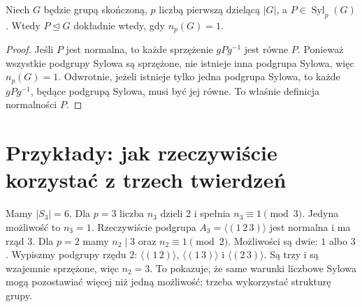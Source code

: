 \begin{wniosek}
\label{aa:wn:normalna-sylow}
Niech $G$ będzie grupą skończoną, $p$ liczbą pierwszą
dzielącą $|G|$, a $P\in\operatorname{Syl}_p(G)$.
Wtedy $P\trianglelefteq G$ dokładnie wtedy, gdy $n_p(G)=1$.
\end{wniosek}
\begin{proof}
Jeśli $P$ jest normalna, to każde sprzężenie $gPg^{-1}$
jest równe $P$. Ponieważ wszystkie podgrupy Sylowa są sprzężone,
nie istnieje inna podgrupa Sylowa, więc $n_p(G)=1$.
Odwrotnie, jeżeli istnieje tylko jedna podgrupa Sylowa,
to każde $gPg^{-1}$, będące podgrupą Sylowa, musi być jej równe.
To właśnie definicja normalności $P$.
\end{proof}

\section{Przykłady: jak rzeczywiście korzystać z trzech twierdzeń}
\begin{przyklad}
\label{aa:prz:sylow-s3}
Mamy $|S_3|=6$.
Dla $p=3$ liczba $n_3$ dzieli $2$ i spełnia
$n_3\equiv1\pmod3$. Jedyna możliwość to $n_3=1$.
Rzeczywiście podgrupa $A_3=\langle(1\,2\,3)\rangle$
jest normalna i ma rząd $3$.
Dla $p=2$ mamy $n_2\mid3$ oraz $n_2\equiv1\pmod2$.
Możliwości są dwie: $1$ albo $3$.
Wypiszmy podgrupy rzędu $2$:
$\langle(1\,2)\rangle$, $\langle(1\,3)\rangle$
i $\langle(2\,3)\rangle$.
Są trzy i są wzajemnie sprzężone, więc $n_2=3$.
To pokazuje, że same warunki liczbowe Sylowa mogą pozostawiać
więcej niż jedną możliwość; trzeba wykorzystać strukturę grupy.
\end{przyklad}


